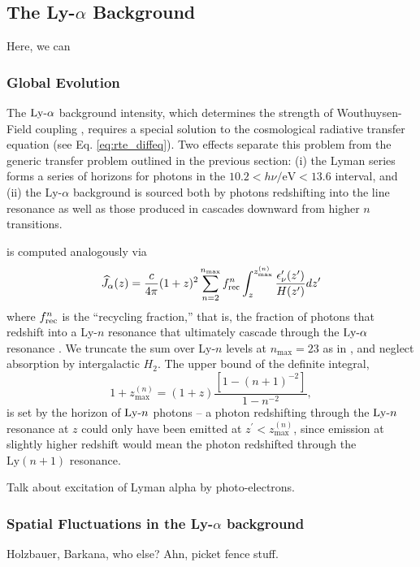 \subsection{The Ly-$\alpha$ Background}
Here, we can 


\subsubsection{Global Evolution}
The $\text{Ly-}\alpha$ background intensity, which determines the strength of Wouthuysen-Field coupling \cite{Wouthuysen1952, Field1958}, requires a special solution to the cosmological radiative transfer equation (see Eq. \ref{eq:rte_diffeq}). Two effects separate this problem from the generic transfer problem outlined in the previous section: (i) the Lyman series forms a series of horizons for photons in the $10.2 < h \nu / \mathrm{eV} < 13.6$ interval, and (ii) the Ly-$\alpha$ background is sourced both by photons redshifting into the line resonance as well as those produced in cascades downward from higher $n$ transitions.


is computed analogously via
\begin{equation}
    \widehat{J}_{\alpha}(z) = \frac{c}{4\pi} (1 + z)^2 \sum_{n = 2}^{n_{\text{max}}} f_{\text{rec}}^{n} \int_z^{z_{\max}^{(n)}} \frac{\epsilon_{\nu}^{\prime}(z^{\prime})}{H(z^{\prime})} dz^{\prime} \label{eq:LymanAlphaFlux}
\end{equation}
where $f_{\text{rec}}^{n}$ is the ``recycling fraction,'' that is, the fraction of photons that redshift into a Ly-$n$ resonance that ultimately cascade through the $\text{Ly-}\alpha$ resonance \cite{Pritchard2006}. We truncate the sum over Ly-$n$ levels at $n_{\max}=23$ as in \cite{Barkana2005}, and neglect absorption by intergalactic $H_2$. The upper bound of the definite integral,
\begin{equation}
    1 + z_{\max}^{(n)} = (1 + z) \frac{\left[1 - (n + 1)^{-2}\right]}{1 - n^{-2}} ,
\end{equation}
is set by the horizon of $\text{Ly-}n$ photons -- a photon redshifting through the  $\text{Ly-}n$ resonance at $z$ could only have been emitted at $z^{\prime} < z_{\max}^{(n)}$, since emission at slightly higher redshift would mean the photon redshifted through the $\text{Ly}(n+1)$ resonance.


Talk about excitation of Lyman alpha by photo-electrons.

\subsubsection{Spatial Fluctuations in the Ly-$\alpha$ background} 
Holzbauer, Barkana, who else? Ahn, picket fence stuff.



